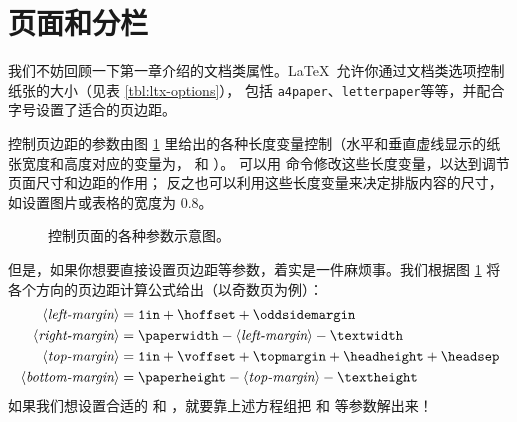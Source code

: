 \section{页面和分栏}\label{sec:page-columns}

我们不妨回顾一下第一章介绍的文档类属性。\LaTeX\ 允许你通过文档类选项控制纸张的大小（见表 \ref{tbl:ltx-options}），
包括 \texttt{a4paper}、\texttt{letterpaper}等等，并配合字号设置了适合的页边距。

\currentpage
控制页边距的参数由图 \ref{fig:layouts} 里给出的各种长度变量控制（水平和垂直虚线显示的纸张宽度和高度对应的变量为，
 和 ）。
可以用  命令修改这些长度变量，以达到调节页面尺寸和边距的作用；
反之也可以利用这些长度变量来决定排版内容的尺寸，如设置图片或表格的宽度为 0.8。

\begin{figure}[!p]
\oddpagelayouttrue
\pagediagram
\caption{控制页面的各种参数示意图。} \label{fig:layouts}
\end{figure}

但是，如果你想要直接设置页边距等参数，着实是一件麻烦事。我们根据图 \ref{fig:layouts} 将各个方向的页边距计算公式给出（以奇数页为例）：
\begin{align*}
\langle\text{\itshape left-margin}\rangle   &= \text{\ttfamily 1in} 
                                             + \text{\cmd{hoffset}}
                                             + \text{\cmd{oddsidemargin}} \\
\langle\text{\itshape right-margin}\rangle  &= \text{\cmd{paperwidth}} 
                                             - \langle\text{\itshape left-margin}\rangle
                                             - \text{\cmd{textwidth}} \\
\langle\text{\itshape top-margin}\rangle    &= \text{\ttfamily 1in} 
                                             + \text{\cmd{voffset}}
                                             + \text{\cmd{topmargin}}
                                             + \text{\cmd{headheight}}
                                             + \text{\cmd{headsep}} \\
\langle\text{\itshape bottom-margin}\rangle &= \text{\cmd{paperheight}}
                                             - \langle\text{\itshape top-margin}\rangle
                                             - \text{\cmd{textheight}}
\end{align*}
如果我们想设置合适的  和 ，就要靠上述方程组把  和  等参数解出来！

